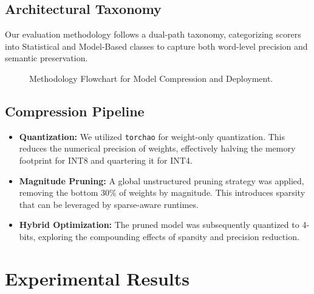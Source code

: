 \documentclass[10pt,journal,compsoc]{IEEEtran}
\begin{document}
\subsection{Architectural Taxonomy}
Our evaluation methodology follows a dual-path taxonomy, categorizing scorers into Statistical and Model-Based classes to capture both word-level precision and semantic preservation.

\begin{figure}[h]
\centering
{}
\caption{Methodology Flowchart for Model Compression and Deployment.}
\label{fig:flowchart}
\end{figure}

\subsection{Compression Pipeline}
\begin{itemize}
    \item \textbf{Quantization:} We utilized \texttt{torchao} for weight-only quantization. This reduces the numerical precision of weights, effectively halving the memory footprint for INT8 and quartering it for INT4.
    \item \textbf{Magnitude Pruning:} A global unstructured pruning strategy was applied, removing the bottom 30\% of weights by magnitude. This introduces sparsity that can be leveraged by sparse-aware runtimes.
    \item \textbf{Hybrid Optimization:} The pruned model was subsequently quantized to 4-bits, exploring the compounding effects of sparsity and precision reduction.
\end{itemize}

\section{Experimental Results}
\end{document}
